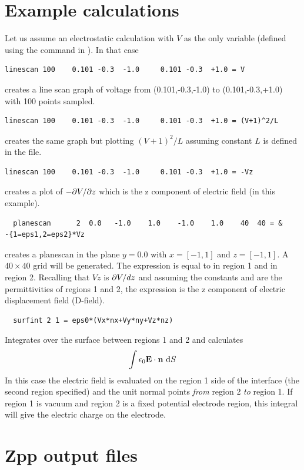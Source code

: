 \documentclass[a4paper,twoside,11pt]{book}
\begin{document}
\section{Example calculations}

Let us assume an electrostatic calculation with $V$ as the only variable
(defined using the  command in ). In that case
\begin{verbatim}
linescan 100    0.101 -0.3  -1.0     0.101 -0.3  +1.0 = V
\end{verbatim}
creates a line scan graph of voltage from (0.101,-0.3,-1.0) to (0.101,-0.3,+1.0)
with 100 points sampled.
\begin{verbatim}
linescan 100    0.101 -0.3  -1.0     0.101 -0.3  +1.0 = (V+1)^2/L
\end{verbatim}
creates the same graph but plotting $(V+1)^2/L$ assuming constant $L$ is defined in the  file.
\begin{verbatim}
linescan 100    0.101 -0.3  -1.0     0.101 -0.3  +1.0 = -Vz
\end{verbatim}
creates a plot of $-\partial V/\partial z$ which is the z component of electric
field (in this example).
\begin{verbatim}
  planescan      2  0.0   -1.0    1.0    -1.0    1.0    40  40 = &
-{1=eps1,2=eps2}*Vz
\end{verbatim}
creates a planescan in the plane $y=0.0$ with $x=[-1,1]$ and
$z=[-1,1]$. A $40\times40$ grid will be generated. The expression is
equal to  in region 1 and  in region
2. Recalling that $Vz$ is $\partial V/d z$ and assuming the constants  and
 are the permittivities of regions 1 and 2, the expression
is the z component of electric displacement field (D-field).
\begin{verbatim}
  surfint 2 1 = eps0*(Vx*nx+Vy*ny+Vz*nz)
\end{verbatim}
Integrates over the surface between regions 1 and 2 and calculates
\begin{equation}
  \int \epsilon_0\mathbf{E}\cdot\mathbf{n}~\mathrm{d} S
\end{equation}
In this case the electric field is evaluated on the region 1 side of
the interface (the second region specified) and the unit normal points
\emph{from} region 2 \emph{to} region 1. If region 1 is vacuum and
region 2 is a fixed potential electrode region, this integral will
give the electric charge on the electrode.

\section{Zpp output files}
\end{document}
